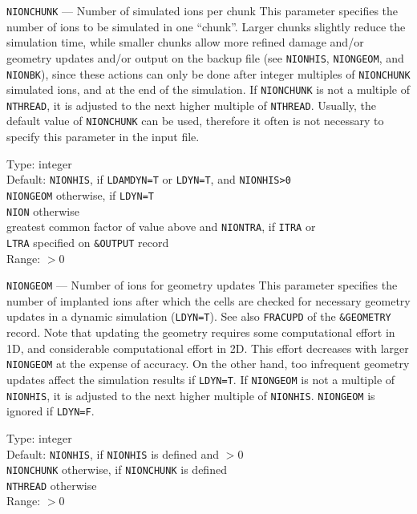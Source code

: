 \begin{keydescription}{\texttt{NIONCHUNK} --- Number of simulated ions per
chunk}
%
  This parameter specifies the number of ions to be simulated in one ``chunk''.
  Larger chunks slightly reduce the simulation time, while smaller chunks
  allow more refined damage and/or geometry updates and/or output on the backup
  file (see \texttt{NIONHIS}, \texttt{NIONGEOM}, and \texttt{NIONBK}), since
  these actions can only be done after integer multiples of \texttt{NIONCHUNK}
  simulated ions, and at the end of the simulation.
  If \texttt{NIONCHUNK} is not a multiple of \texttt{NTHREAD}, it is 
  adjusted to the next higher multiple of \texttt{NTHREAD}.
  Usually, the default value of \texttt{NIONCHUNK} can be used, therefore it 
  often is not necessary to specify this parameter in the input file.
%
  \begin{keytab}
    Type:    \> integer \\
    Default: \> \texttt{NIONHIS}, if \texttt{LDAMDYN=T} or \texttt{LDYN=T},
                and \texttt{NIONHIS>0} \\ 
    		 \> \texttt{NIONGEOM} otherwise, if \texttt{LDYN=T} \\
    		 \> \texttt{NION} otherwise \\
    		 \> greatest common factor of value above and \texttt{NIONTRA}, 
    		    if \texttt{ITRA} or \\
    		 \>  \texttt{LTRA} specified on \texttt{\&OUTPUT} record \\
    Range:   \> $> 0$
  \end{keytab}
\end{keydescription}

\begin{keydescription}{\texttt{NIONGEOM} --- Number of ions for geometry updates}
%
  This parameter specifies the number of implanted ions after which the
  cells are checked for necessary geometry updates in a dynamic simulation
  (\texttt{LDYN=T}). See also \texttt{FRACUPD} of the \texttt{\&GEOMETRY}
  record. Note that updating the geometry requires some computational effort in
  1D, and considerable computational effort in 2D. This effort decreases with 
  larger \texttt{NIONGEOM} at the expense of accuracy. On the other hand, too
  infrequent geometry updates affect the simulation results if \texttt{LDYN=T}.
  If \texttt{NIONGEOM} is not a multiple of \texttt{NIONHIS}, it is adjusted 
  to the next higher multiple of \texttt{NIONHIS}. \texttt{NIONGEOM} is ignored 
  if \texttt{LDYN=F}.
  \begin{keytab}
    Type:    \> integer \\
    Default: \> \texttt{NIONHIS}, if \texttt{NIONHIS} is defined and $> 0$ \\
    		 \> \texttt{NIONCHUNK} otherwise, if \texttt{NIONCHUNK} is defined \\
    		 \> \texttt{NTHREAD} otherwise \\
    Range:   \> $> 0$
  \end{keytab}
\end{keydescription}

